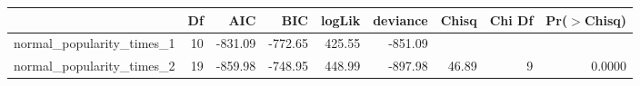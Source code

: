 \begin{table}[ht]
\centering
\begin{tabular}{lrrrrrrrr}
  \hline
 & Df & AIC & BIC & logLik & deviance & Chisq & Chi Df & Pr($>$Chisq) \\ 
  \hline
normal\_popularity\_times\_1 & 10 & -831.09 & -772.65 & 425.55 & -851.09 &  &  &  \\ 
  normal\_popularity\_times\_2 & 19 & -859.98 & -748.95 & 448.99 & -897.98 & 46.89 & 9 & 0.0000 \\ 
   \hline
\end{tabular}
\end{table}
